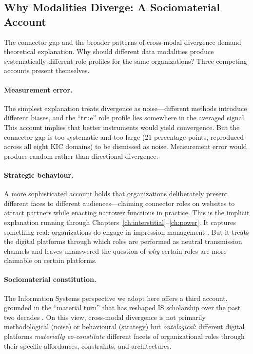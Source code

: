 \documentclass[../main.tex]{subfiles}
\begin{document}
\subsection{Why Modalities Diverge: A Sociomaterial Account}

The connector gap and the broader patterns of cross-modal divergence demand theoretical explanation. Why should different data modalities produce systematically different role profiles for the same organizations? Three competing accounts present themselves.

\paragraph{Measurement error.} The simplest explanation treats divergence as noise---different methods introduce different biases, and the ``true'' role profile lies somewhere in the averaged signal. This account implies that better instruments would yield convergence. But the connector gap is too systematic and too large (21 percentage points, reproduced across all eight KIC domains) to be dismissed as noise. Measurement error would produce random rather than directional divergence.

\paragraph{Strategic behaviour.} A more sophisticated account holds that organizations deliberately present different faces to different audiences---claiming connector roles on websites to attract partners while enacting narrower functions in practice. This is the implicit explanation running through Chapters~\ref{ch:interstitial}--\ref{ch:power}. It captures something real: organizations do engage in impression management \cite{gioia2013organizational}. But it treats the digital platforms through which roles are performed as neutral transmission channels and leaves unanswered the question of \emph{why} certain roles are more claimable on certain platforms.

\paragraph{Sociomaterial constitution.} The Information Systems perspective we adopt here offers a third account, grounded in the ``material turn'' that has reshaped IS scholarship over the past two decades \cite{Orlikowski2007,orlikowski2008sociomateriality,leonardi2012materiality}. On this view, cross-modal divergence is not primarily methodological (noise) or behavioural (strategy) but \emph{ontological}: different digital platforms \emph{materially co-constitute} different facets of organizational roles through their specific affordances, constraints, and architectures.
\end{document}
